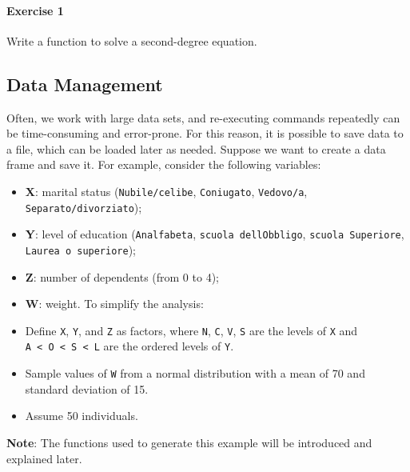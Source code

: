 \documentclass[
]{article}
\providecommand{\tightlist}{%
  \setlength{\itemsep}{0pt}\setlength{\parskip}{0pt}}
\begin{document}
\hypertarget{exercise-1}{%
\paragraph{Exercise 1}\label{exercise-1}}

Write a function to solve a second-degree equation.

\hypertarget{data-management}{%
\subsection{Data Management}\label{data-management}}

Often, we work with large data sets, and re-executing commands
repeatedly can be time-consuming and error-prone. For this reason, it is
possible to save data to a file, which can be loaded later as needed.
Suppose we want to create a data frame and save it. For example,
consider the following variables:

\begin{itemize}
\tightlist
\item
  \textbf{X}: marital status (\texttt{Nubile/celibe},
  \texttt{Coniugato}, \texttt{Vedovo/a}, \texttt{Separato/divorziato});
\item
  \textbf{Y}: level of education (\texttt{Analfabeta},
  \texttt{scuola\ dell\textquotesingle{}Obbligo},
  \texttt{scuola\ Superiore}, \texttt{Laurea\ o\ superiore});
\item
  \textbf{Z}: number of dependents (from 0 to 4);
\item
  \textbf{W}: weight. To simplify the analysis:
\item
  Define \texttt{X}, \texttt{Y}, and \texttt{Z} as factors, where
  \texttt{N}, \texttt{C}, \texttt{V}, \texttt{S} are the levels of
  \texttt{X} and
  \texttt{A\ \textless{}\ O\ \textless{}\ S\ \textless{}\ L} are the
  ordered levels of \texttt{Y}.
\item
  Sample values of \texttt{W} from a normal distribution with a mean of
  70 and standard deviation of 15.
\item
  Assume 50 individuals.
\end{itemize}

\textbf{Note}: The functions used to generate this example will be
introduced and explained later.
\end{document}
